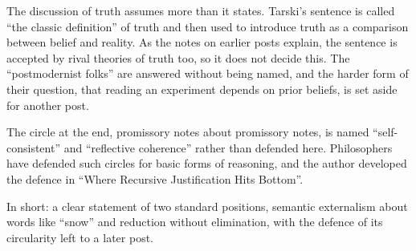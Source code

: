 \begin{afterword}
The discussion of truth assumes more than it states. Tarski's sentence is called ``the classic definition'' of truth and then used to introduce truth as a comparison between belief and reality. As the notes on earlier posts explain, the sentence is accepted by rival theories of truth too, so it does not decide this. The ``postmodernist folks'' are answered without being named, and the harder form of their question, that reading an experiment depends on prior beliefs, is set aside for another post.

The circle at the end, promissory notes about promissory notes, is named ``self-consistent'' and ``reflective coherence'' rather than defended here. Philosophers have defended such circles for basic forms of reasoning, and the author developed the defence in ``Where Recursive Justification Hits Bottom''.

In short: a clear statement of two standard positions, semantic externalism about words like ``snow'' and reduction without elimination, with the defence of its circularity left to a later post.
\end{afterword}

